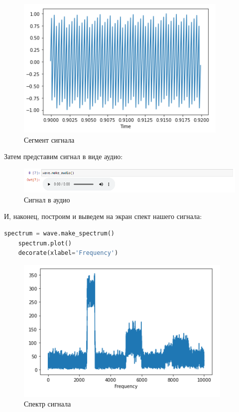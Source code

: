 \documentclass[a4paper]{article}
\begin{document}
            \begin{figure}[H]
                \centering
                \includegraphics{ex_3_segment.png}
                \caption{Сегмент сигнала}
                \label{fig:ex_3_segment}
            \end{figure}
            
            Затем представим сигнал в виде аудио:
            
            \begin{figure}[H]
                \centering
                \includegraphics[width=\textwidth]{ex_3_wave_audio.png}
                \caption{Сигнал в аудио}
                \label{fig:ex_3_wave_audio}
            \end{figure}
            
            И, наконец, построим и выведем на экран спект нашего сигнала:
            
\begin{lstlisting}[language=Python, caption= Спектр сигнала]
    spectrum = wave.make_spectrum()
    spectrum.plot()
    decorate(xlabel='Frequency')
\end{lstlisting}               
            
            \begin{figure}[H]
                \centering
                \includegraphics{ex_3_wave_spectr.png}
                \caption{Спектр сигнала}
                \label{fig:ex_3_wave_spectr}
            \end{figure}
            
\end{document}
